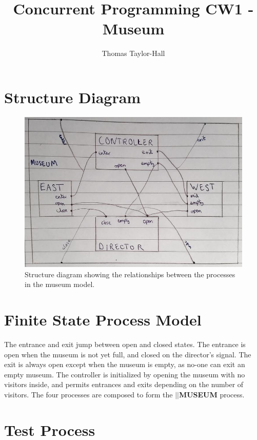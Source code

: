 \documentclass[11pt]{article} %
\title{Concurrent Programming CW1 - Museum}
\author{Thomas Taylor-Hall}
\begin{document}
\maketitle

\section{Structure Diagram}

\begin{figure}[h!]
	\includegraphics[width=\textwidth]{structure-diagram.jpg}
	\caption{Structure diagram showing the relationships between the processes in the museum model.}
\end{figure}


\pagebreak
\section{Finite State Process Model}



The entrance and exit jump between open and closed states. The entrance is open when the museum is not yet full, and closed on
the director's signal. The exit is always open except when the museum is empty, as no-one can exit an empty museum. The controller is
initialized by opening the museum with no visitors inside, and permits entrances and exits depending on the number of visitors. The
four processes are composed to form the \textbf{$||$MUSEUM} process.


\pagebreak
\section{Test Process}
\end{document}
